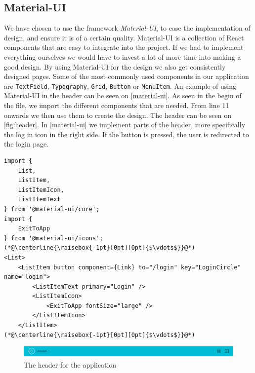 \subsection{Material-UI}
We have chosen to use the framework \textit{Material-UI}, to ease the implementation of design, and ensure it is of a certain quality.
Material-UI is a collection of React components that are easy to integrate into the project.
If we had to implement everything ourselves we would have to invest a lot of more time into making a good design.
By using Material-UI for the design we also get consistently designed pages.
Some of the most commonly used components in our application are \texttt{TextField}, \texttt{Typography}, \texttt{Grid}, \texttt{Button} or \texttt{MenuItem}.
An example of using Material-UI in the header can be seen on \autoref{material-ui}.
As seen in the begin of the file, we import the different components that are needed.
From line 11 onwards we then use them to create the design.
The header can be seen on \autoref{fig:header}.
In \autoref{material-ui} we implement parts of the header, more specifically the log in icon in the right side.
If the button is pressed, the user is redirected to the login page.
\begin{lstlisting}[caption={Use of material-ui in the header}, captionpos=b, label={material-ui}]
import {
    List,
    ListItem,
    ListItemIcon,
    ListItemText
} from '@material-ui/core';
import {
	ExitToApp
} from '@material-ui/icons';
(*@\centerline{\raisebox{-1pt}[0pt][0pt]{$\vdots$}}@*)
<List>
    <ListItem button component={Link} to="/login" key="LoginCircle" name="login">
        <ListItemText primary="Login" />
        <ListItemIcon>
            <ExitToApp fontSize="large" />
        </ListItemIcon>
    </ListItem>
(*@\centerline{\raisebox{-1pt}[0pt][0pt]{$\vdots$}}@*)
\end{lstlisting}


\begin{figure}[H]
    \includegraphics[width=\linewidth]{figures/header.png}
    \caption{The header for the application}
    \label{fig:header}
\end{figure}
  
